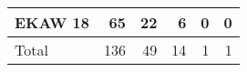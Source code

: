 \begin{table}[!htb]
\begin{tabular}{l|rrrrr}
EKAW 18             & 65                                                                                         & 22                                                                                             & 6                                                                                                             & 0                                                                                              & 0                                                                                                             \\ \hline
Total               & 136                                                                                        & 49                                                                                             & 14                                                                                                            & 1
 & 1                                                                                                            
\end{tabular}
\end{table}